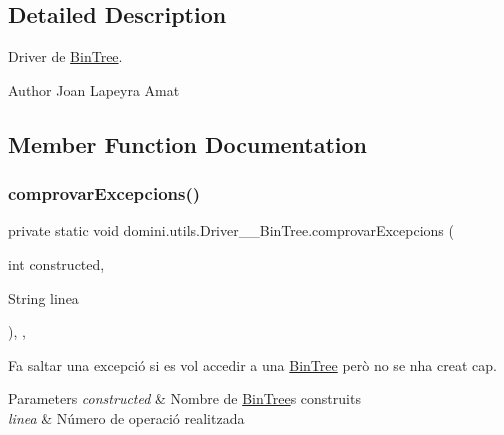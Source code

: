 \subsection{Detailed Description}
Driver de \hyperlink{classdomini_1_1utils_1_1BinTree}{Bin\+Tree}. 

\begin{DoxyAuthor}{Author}
Joan Lapeyra Amat 
\end{DoxyAuthor}


\subsection{Member Function Documentation}
\mbox{\label{classdomini_1_1utils_1_1Driver____BinTree_a06b6edeb965f3677c7ebb085d512f568}} 
\subsubsection{\texorpdfstring{comprovar\+Excepcions()}{comprovarExcepcions()}}
{\footnotesize\ttfamily private static void domini.\+utils.\+Driver\+\_\+\+\_\+\+Bin\+Tree.\+comprovar\+Excepcions (\begin{DoxyParamCaption}\item[{int}]{constructed,  }\item[{String}]{linea }\end{DoxyParamCaption})\hspace{0.3cm}{\ttfamily [inline]}, {\ttfamily [static]}, {\ttfamily [private]}}



Fa saltar una excepció si es vol accedir a una \hyperlink{classdomini_1_1utils_1_1BinTree}{Bin\+Tree} però no se n\textquotesingle{}ha creat cap. 


\begin{DoxyParams}{Parameters}
{\em constructed} & Nombre de \hyperlink{classdomini_1_1utils_1_1BinTree}{Bin\+Tree}\textquotesingle{}s construits \\
\hline
{\em linea} & Número de operació realitzada \\
\hline
\end{DoxyParams}

